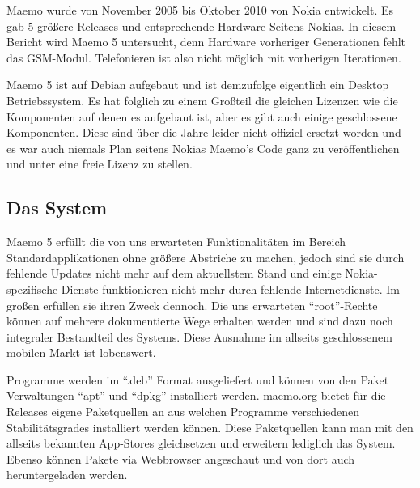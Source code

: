 Maemo wurde von November 2005\thinspace\cite{online:maemo1-770} bis Oktober 2010\thinspace\cite{online:maemo5-n900} von Nokia entwickelt. Es gab 5 größere Releases und entsprechende Hardware Seitens Nokias\thinspace\cite{online:maemo1-770}\thinspace\cite{online:n800-specs}\thinspace\cite{online:n810-specs}\thinspace\cite{online:n900-specs}. In diesem Bericht wird Maemo 5 untersucht, denn Hardware vorheriger Generationen fehlt das GSM-Modul. Telefonieren ist also nicht möglich mit vorherigen Iterationen.

Maemo 5 ist auf Debian aufgebaut\thinspace\cite{online:maemo-about} und ist demzufolge eigentlich ein Desktop Betriebssystem. Es hat folglich zu einem Großteil die gleichen Lizenzen wie die Komponenten auf denen es aufgebaut ist, aber es gibt auch einige geschlossene Komponenten\thinspace\cite{online:maemo5-components}. Diese sind über die Jahre leider nicht offiziel ersetzt worden und es war auch niemals Plan seitens Nokias Maemo's Code ganz zu veröffentlichen und unter eine freie Lizenz zu stellen\thinspace\cite{online:maemo-slides}.
\newline

\subsection{Das System}
Maemo 5 erfüllt die von uns erwarteten Funktionalitäten im Bereich Standardapplikationen ohne größere Abstriche zu machen, jedoch sind sie durch fehlende Updates nicht mehr auf dem aktuellstem Stand und einige Nokia-spezifische Dienste funktionieren nicht mehr durch fehlende Internetdienste. Im großen erfüllen sie ihren Zweck dennoch. Die uns erwarteten ``root''-Rechte können auf mehrere dokumentierte Wege erhalten werden und sind dazu noch integraler Bestandteil des Systems\thinspace\cite{online:maemo-root}. Diese Ausnahme im allseits geschlossenem mobilen Markt ist lobenswert.

Programme werden im ``.deb'' Format ausgeliefert und können von den Paket Verwaltungen ``apt'' und ``dpkg'' installiert werden\thinspace\cite{online:maemo-packetinstalling}.
\mbox{maemo.org} bietet für die Releases eigene Paketquellen an aus welchen Programme verschiedenen Stabilitätsgrades installiert werden können\thinspace\cite{online:maemo-extras}. Diese Paketquellen kann man mit den allseits bekannten \mbox{App-Stores} gleichsetzen und erweitern lediglich das System. Ebenso können Pakete via Webbrowser angeschaut und von dort auch heruntergeladen  werden\thinspace\cite{online:maemo-store}\thinspace\cite{online:maemo-rawrepos}.

